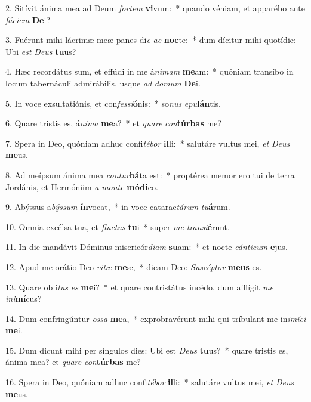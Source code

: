 2. Sitívit ánima mea ad Deum \textit{for}\textit{tem} \textbf{vi}vum:~*  quando véniam, et apparébo ante \textit{fá}\textit{ci}\textit{em} \textbf{De}i?\

3. Fuérunt mihi lácrimæ meæ panes di\textit{e} \textit{ac} \textbf{noc}te:~*  dum dícitur mihi quotídie: Ubi \textit{est} \textit{De}\textit{us} \textbf{tu}us?\

4. Hæc recordátus sum, et effúdi in me á\textit{ni}\textit{mam} \textbf{me}am:~*  quóniam transíbo in locum tabernáculi admirábilis, usque \textit{ad} \textit{do}\textit{mum} \textbf{De}i.\

5. In voce exsultatiónis, et con\textit{fes}\textit{si}\textbf{ó}nis:~*  so\textit{nus} \textit{e}\textit{pu}\textbf{lán}tis.\

6. Quare tristis es, á\textit{ni}\textit{ma} \textbf{me}a?~*  et \textit{qua}\textit{re} \textit{con}\textbf{túr}\textbf{bas} me?\

7. Spera in Deo, quóniam adhuc confi\textit{té}\textit{bor} \textbf{il}li:~*  salutáre vultus mei, \textit{et} \textit{De}\textit{us} \textbf{me}us.\

8. Ad meípsum ánima mea \textit{con}\textit{tur}\textbf{bá}ta est:~*  proptérea memor ero tui de terra Jordánis, et Hermóniim \textit{a} \textit{mon}\textit{te} \textbf{mó}\textbf{di}co.\

9. Abýssus a\textit{býs}\textit{sum} \textbf{ín}vocat,~*  in voce catarac\textit{tá}\textit{rum} \textit{tu}\textbf{á}rum.\

10. Omnia excélsa tua, et \textit{fluc}\textit{tus} \textbf{tu}i~*  super \textit{me} \textit{trans}\textit{i}\textbf{é}runt.\

11. In die mandávit Dóminus misericór\textit{di}\textit{am} \textbf{su}am:~*  et nocte \textit{cán}\textit{ti}\textit{cum} \textbf{e}jus.\

12. Apud me orátio Deo \textit{vi}\textit{tæ} \textbf{me}æ,~*  dicam Deo: \textit{Su}\textit{scép}\textit{tor} \textbf{me}\textbf{us} es.\

13. Quare oblí\textit{tus} \textit{es} \textbf{me}i?~*  et quare contristátus incédo, dum afflígit \textit{me} \textit{in}\textit{i}\textbf{mí}cus?\

14. Dum confringúntur \textit{os}\textit{sa} \textbf{me}a,~*  exprobravérunt mihi qui tríbulant me in\textit{i}\textit{mí}\textit{ci} \textbf{me}i.\

15. Dum dicunt mihi per síngulos dies: Ubi est \textit{De}\textit{us} \textbf{tu}us?~*  quare tristis es, ánima mea? et \textit{qua}\textit{re} \textit{con}\textbf{túr}\textbf{bas} me?\

16. Spera in Deo, quóniam adhuc confi\textit{té}\textit{bor} \textbf{il}li:~*  salutáre vultus mei, \textit{et} \textit{De}\textit{us} \textbf{me}us.\


